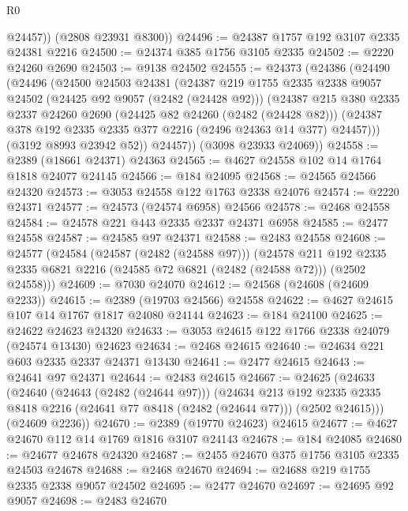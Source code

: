 \begin{lexlean}{R0}
\begin{coremodule}
          @24457))
      (@2808 @23931 @8300))
@24496 := @24387 @1757 @192 @3107 @2335 @24381 @2216
@24500 := @24374 @385 @1756 @3105 @2335
@24502 := @2220 @24260 @2690
@24503 := @9138 @24502
@24555 := @24373
    (@24386
      (@24490
        (@24496
          (@24500
            @24503
            @24381
            (@24387
              @219
              @1755
              @2335
              @2338
              @9057
              @24502
              (@24425 @92 @9057 (@2482 (@24428 @92)))
              (@24387
                @215
                @380
                @2335
                @2337
                @24260
                @2690
                (@24425 @82 @24260 (@2482 (@24428 @82)))
                (@24387 @378 @192 @2335 @2335 @377 @2216 (@2496 @24363 @14 @377) @24457)))
            (@3192 @8993 @23942 @52))
          @24457))
      (@3098 @23933 @24069))
@24558 := @2389 (@18661 @24371) @24363
@24565 := @4627 @24558 @102 @14 @1764 @1818 @24077 @24145
@24566 := @184 @24095
@24568 := @24565 @24566 @24320
@24573 := @3053 @24558 @122 @1763 @2338 @24076
@24574 := @2220 @24371
@24577 := @24573 (@24574 @6958) @24566
@24578 := @2468 @24558
@24584 := @24578 @221 @443 @2335 @2337 @24371 @6958
@24585 := @2477 @24558
@24587 := @24585 @97 @24371
@24588 := @2483 @24558
@24608 := @24577
    (@24584
      (@24587 (@2482 (@24588 @97)))
      (@24578
        @211
        @192
        @2335
        @2335
        @6821
        @2216
        (@24585 @72 @6821 (@2482 (@24588 @72)))
        (@2502 @24558)))
@24609 := @7030 @24070
@24612 := @24568 (@24608 (@24609 @2233))
@24615 := @2389 (@19703 @24566) @24558
@24622 := @4627 @24615 @107 @14 @1767 @1817 @24080 @24144
@24623 := @184 @24100
@24625 := @24622 @24623 @24320
@24633 := @3053 @24615 @122 @1766 @2338 @24079 (@24574 @13430) @24623
@24634 := @2468 @24615
@24640 := @24634 @221 @603 @2335 @2337 @24371 @13430
@24641 := @2477 @24615
@24643 := @24641 @97 @24371
@24644 := @2483 @24615
@24667 := @24625
    (@24633
      (@24640
        (@24643 (@2482 (@24644 @97)))
        (@24634
          @213
          @192
          @2335
          @2335
          @8418
          @2216
          (@24641 @77 @8418 (@2482 (@24644 @77)))
          (@2502 @24615)))
      (@24609 @2236))
@24670 := @2389 (@19770 @24623) @24615
@24677 := @4627 @24670 @112 @14 @1769 @1816 @3107 @24143
@24678 := @184 @24085
@24680 := @24677 @24678 @24320
@24687 := @2455 @24670 @375 @1756 @3105 @2335 @24503 @24678
@24688 := @2468 @24670
@24694 := @24688 @219 @1755 @2335 @2338 @9057 @24502
@24695 := @2477 @24670
@24697 := @24695 @92 @9057
@24698 := @2483 @24670

\end{coremodule}
\end{lexlean}
